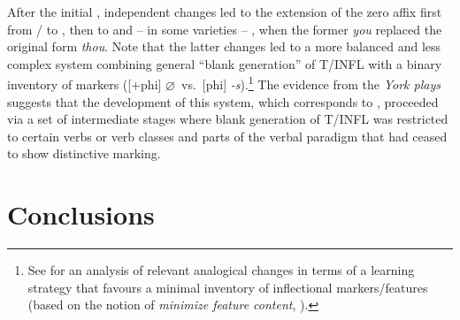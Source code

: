 \documentclass[output=paper]{langsci/langscibook}
\begin{document}
After the initial , independent changes led to the extension of the
zero affix first from \Fpl/\Spl{} to \Tpl{}, then to \Fsg{} and – in some varieties –
\Ssg{}, when the former \Spl{} \emph{you} replaced the original \Ssg{} form
\emph{thou}. Note that the latter changes led to a more balanced and less
complex  system combining general ``blank generation'' of T/INFL with
a binary inventory of  markers ([+phi] $\varnothing$\ vs.\ [\textminus phi]
\emph{-s}).\footnote{See \textcite{Fuss:2010} for an analysis of relevant analogical
    changes in terms of a learning strategy that favours a minimal inventory of
    inflectional markers/features (based on the notion of \emph{minimize feature
content}, \citealt{Halle:1997}).} The evidence from the \emph{York plays}
suggests that the development of this system, which corresponds to , proceeded via a set of intermediate stages where blank generation of
T/INFL was restricted to certain verbs or verb classes and parts of the verbal
paradigm that had ceased to show distinctive  marking.

\section{Conclusions}\label{sec:10.summary}
\end{document}
